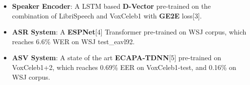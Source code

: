 \documentclass[20pt,margin=1in,innermargin=-4.5in,blockverticalspace=-0.25in]{tikzposter}
\begin{document}
\begin{columns}
{\begin{itemize}
\begin{itemize}
    			\item \textbf{Speaker Encoder}: A LSTM based \textbf{D-Vector} pre-trained on the combination of
    			LibriSpeech and VoxCeleb1 with \textbf{GE2E} loss[3]. 
    
    			\item \textbf{ASR System}: A \textbf{ESPNet}[4] Transformer pre-trained on WSJ corpus, which reaches
    			6.6\% WER on WSJ test\_eavl92.
    
    			\item \textbf{ASV System}: A state of the art \textbf{ECAPA-TDNN}[5] pre-trained on VoxCeleb1+2, which
    			reaches 0.69\% EER on VoxCeleb1-test, and 0.16\% on WSJ corpus.
    		\end{itemize}
    		\end{itemize}
    		
		
	}
    

\end{columns}
\end{document}
